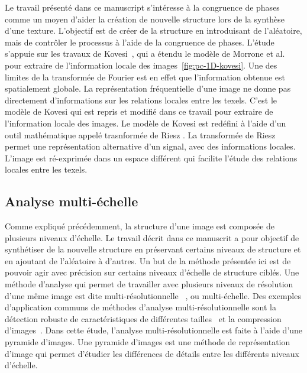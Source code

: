 Le travail présenté dans ce manuscript s'intéresse à la congruence de phases comme un moyen d'aider la création de nouvelle structure lors de la synthèse d'une texture. L'objectif est de créer de la structure en introduisant de l'aléatoire, mais de contrôler le processus à l'aide de la congruence de phases. L'étude s'appuie sur les travaux de Kovesi~\cite{kovesi_image_1995}, qui a étendu le modèle de Morrone et al.~\cite{morrone_feature_1987, morrone_feature_1988} pour extraire de l'information locale des images~\ref{fig:pc-1D-kovesi}. Une des limites de la transformée de Fourier est en effet que l'information obtenue est spatialement globale. La représentation fréquentielle d'une image ne donne pas directement d'informations sur les relations locales entre les texels. C'est le modèle de Kovesi qui est repris et modifié dans ce travail pour extraire de l'information locale des images. Le modèle de Kovesi est redéfini à l'aide d'un outil mathématique appelé \og trasnformée de Riesz \fg. La transformée de Riesz permet une représentation alternative d'un signal, avec des informations locales. L'image est ré-exprimée dans un espace différent qui facilite l'étude des relations locales entre les texels.

\subsection*{Analyse multi-échelle}

Comme expliqué précédemment, la structure d'une image est composée de plusieurs niveaux d'échelle. Le travail décrit dans ce manuscrit a pour objectif de synthétiser de la nouvelle structure en préservant certains niveaux de structure et en ajoutant de l'aléatoire à d'autres. Un but de la méthode présentée ici est de pouvoir agir avec précision sur certains niveaux d'échelle de structure ciblés. Une méthode d'analyse qui permet de travailler avec plusieurs niveaux de résolution d'une même image est dite \og multi-résolutionnelle \fg~\cite{mallat_theory_1989}, ou multi-échelle. Des exemples d'application communs de méthodes d'analyse multi-résolutionnelle sont la détection robuste de caractéristiques de différentes tailles~\cite{park_multiresolution_2010} et la compression d'images~\cite{averbuch_image_1996}. Dans cette étude, l'analyse multi-résolutionnelle est faite à l'aide d'une pyramide d'images. Une \og pyramide d'images \fg est une méthode de représentation d'image qui permet d'étudier les différences de détails entre les différents niveaux d'échelle.

